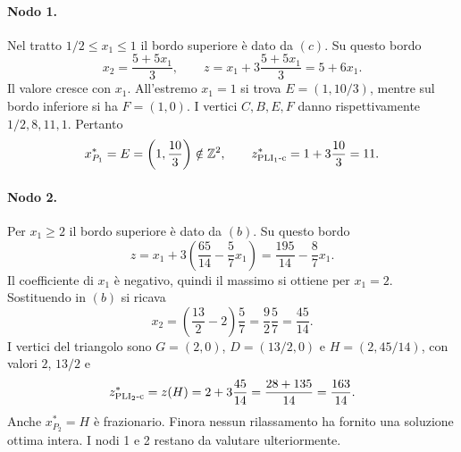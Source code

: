 \paragraph{Nodo 1.}
Nel tratto $1/2\leq x_1\leq1$ il bordo superiore è dato da $(c)$.
Su questo bordo
\[
 x_2=\frac{5+5x_1}{3},\qquad
 z=x_1+3\frac{5+5x_1}{3}=5+6x_1.
\]
Il valore cresce con $x_1$. All'estremo $x_1=1$ si trova
$E=(1,10/3)$, mentre sul bordo inferiore si ha $F=(1,0)$.
I vertici $C,B,E,F$ danno rispettivamente $1/2,8,11,1$. Pertanto
\[
 x^*_{P_1}=E=\left(1,\frac{10}{3}\right)\notin\mathbb Z^2,
 \qquad z^*_{\mathrm{PLI}_{1}\text{-c}}=1+3\frac{10}{3}=11.
\]

\paragraph{Nodo 2.}
Per $x_1\geq2$ il bordo superiore è dato da $(b)$. Su questo bordo
\[
 z=x_1+3\left(\frac{65}{14}-\frac57x_1\right)
   =\frac{195}{14}-\frac87x_1.
\]
Il coefficiente di $x_1$ è negativo, quindi il massimo si ottiene per
$x_1=2$. Sostituendo in $(b)$ si ricava
\[
 x_2=\left(\frac{13}{2}-2\right)\frac57
     =\frac92\frac57=\frac{45}{14}.
\]
I vertici del triangolo sono $G=(2,0)$, $D=(13/2,0)$ e
$H=(2,45/14)$, con valori $2$, $13/2$ e
\[
 z^*_{\mathrm{PLI}_{2}\text{-c}}=z(H)=2+3\frac{45}{14}
   =\frac{28+135}{14}=\frac{163}{14}.
\]
Anche $x^*_{P_2}=H$ è frazionario. Finora nessun rilassamento ha fornito
una soluzione ottima intera. I nodi 1 e 2 restano da valutare ulteriormente.

